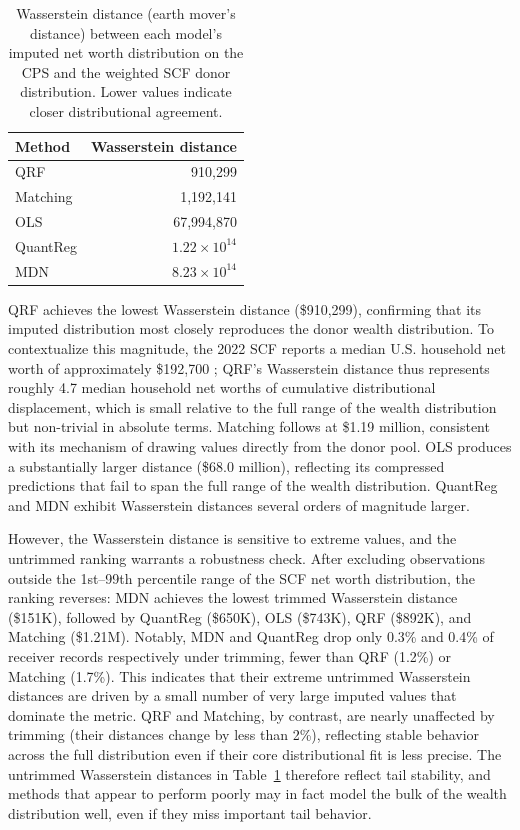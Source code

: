\begin{table}[H]
    \centering
    \caption{Wasserstein distance (earth mover's distance) between each model's imputed net worth distribution on the CPS and the weighted SCF donor distribution. Lower values indicate closer distributional agreement.}
    \label{tab:wasserstein}
    \begin{tabular}{lr}
        \toprule
        Method & Wasserstein distance \\
        \midrule
        QRF & 910,299 \\
        Matching & 1,192,141 \\
        OLS & 67,994,870 \\
        QuantReg & $1.22 \times 10^{14}$ \\
        MDN & $8.23 \times 10^{14}$ \\
        \bottomrule
    \end{tabular}
\end{table}

QRF achieves the lowest Wasserstein distance (\$910,299), confirming that its imputed distribution most closely reproduces the donor wealth distribution. To contextualize this magnitude, the 2022 SCF reports a median U.S. household net worth of approximately \$192,700 \citep{fed2023scf}; QRF's Wasserstein distance thus represents roughly 4.7 median household net worths of cumulative distributional displacement, which is small relative to the full range of the wealth distribution but non-trivial in absolute terms. Matching follows at \$1.19 million, consistent with its mechanism of drawing values directly from the donor pool. OLS produces a substantially larger distance (\$68.0 million), reflecting its compressed predictions that fail to span the full range of the wealth distribution. QuantReg and MDN exhibit Wasserstein distances several orders of magnitude larger.

However, the Wasserstein distance is sensitive to extreme values, and the untrimmed ranking warrants a robustness check. After excluding observations outside the 1st--99th percentile range of the SCF net worth distribution, the ranking reverses: MDN achieves the lowest trimmed Wasserstein distance (\$151K), followed by QuantReg (\$650K), OLS (\$743K), QRF (\$892K), and Matching (\$1.21M). Notably, MDN and QuantReg drop only 0.3\% and 0.4\% of receiver records respectively under trimming, fewer than QRF (1.2\%) or Matching (1.7\%). This indicates that their extreme untrimmed Wasserstein distances are driven by a small number of very large imputed values that dominate the metric. QRF and Matching, by contrast, are nearly unaffected by trimming (their distances change by less than 2\%), reflecting stable behavior across the full distribution even if their core distributional fit is less precise. The untrimmed Wasserstein distances in Table~\ref{tab:wasserstein} therefore reflect tail stability, and methods that appear to perform poorly may in fact model the bulk of the wealth distribution well, even if they miss important tail behavior.

